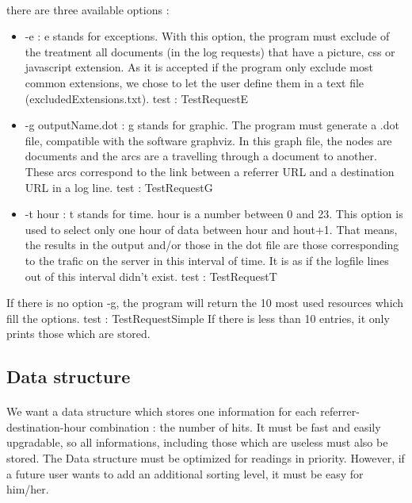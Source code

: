 \documentclass[a4paper, 12pts]{article}
\begin{document}
\paragraph{} 
 there are three available options :
 \begin{itemize}[label=$\square$]
 \item -e : e stands for exceptions. With this option, the program must exclude of the treatment all documents (in the log requests) that have a picture, css or javascript extension. As it is accepted if the program only exclude most common extensions, we chose to let the user define them in a text file (excludedExtensions.txt). test : TestRequestE
 \item -g outputName.dot : g stands for graphic. The program must generate a .dot file, compatible with the software graphviz. In this graph file, the nodes are documents and the arcs are a travelling through a document to another. These arcs correspond to the link between a referrer URL and a destination URL in a log line. test : TestRequestG
 \item -t hour : t stands for time. hour is a number between 0 and 23. This option is used to select only one hour of data between hour and hout+1. That means, the results in the output and/or those in the dot file are those corresponding to the trafic on the server in this interval of time. It is as if the logfile lines out of this interval didn't exist. test : TestRequestT
 \end{itemize}
 If there is no option -g, the program will return the 10 most used resources which fill the options. test : TestRequestSimple
 If there is less than 10 entries, it only prints those which are stored.

\subsection{Data structure}
\paragraph{}
 We want a data structure which stores one information for each referrer-destination-hour combination : the number of hits. It must be fast and easily upgradable, so all informations, including those which are useless must also be stored.
 The Data structure must be optimized for readings in priority. However, if a future user wants to add an additional sorting level, it must be easy for him/her.
 
\newpage
 
\end{document}
